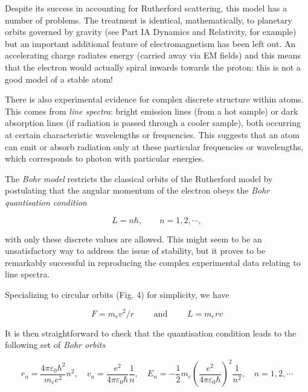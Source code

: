 \documentclass[a4paper]{article}
\begin{document}
Despite its success in accounting for Rutherford scattering, this model has a number of problems. The treatment is identical, mathematically, to planetary orbits governed by gravity (see Part IA Dynamics and Relativity, for example) but an important additional feature of electromagnetism has been left out. An accelerating charge radiates energy (carried away via EM fields) and this means that the electron would actually spiral inwards towards the proton: this is not a good model of a stable atom!


There is also experimental evidence for complex discrete structure within atoms. This comes from \emph{line spectra}: bright emission lines (from a hot sample) or dark absorption lines (if radiation is passed through a cooler sample), both occurring at certain characteristic wavelengths or frequencies. This suggests that an atom can emit or absorb radiation only at these particular frequencies or wavelengths, which corresponds to photon with particular energies.

The \emph{Bohr model} restricts the classical orbits of the Rutherford model by postulating that the angular momentum of the electron obeys the \emph{Bohr quantisation condition}

\[ L = n \hbar, \qquad n = 1,2,\cdots,\]
 
with only these discrete values are allowed. This might seem to be an unsatisfactory way to address the issue of stability, but it proves to be remarkably successful in reproducing the complex experimental data relating to line spectra.

Specializing to circular orbits (Fig. 4) for simplicity, we have 

\[ F = m_{e} v^{2} / r \qquad \text{ and } \qquad L = m_{e} r v \]

 \begin{center}
\end{center}

It is then straightforward to check that the quantisation condition leads to the following set of \emph{Bohr orbits}

\[ r_{n} = \frac{4 \pi \varepsilon_{0} \hbar^{2}}{m_{e} e^{2}} n^{2}, \quad v_{n} = \frac{e^{2}}{4 \pi \varepsilon_{0} \hbar} \frac{1}{n}, \quad E_{n} 
= - \frac{1}{2} m_{e} \left(  \frac{e^{2}}{4 \pi \varepsilon_{0} \hbar} \right)^{2} \frac{1}{n^{2}}, \quad n = 1,2,\cdots   \]
\end{document}
